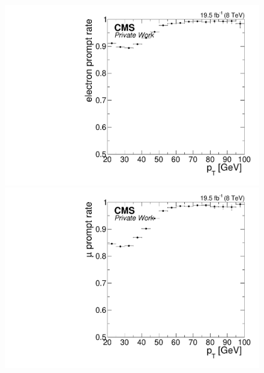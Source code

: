 \begin{figure}[tbp]
\centering
\begin{minipage}[t]{0.49\textwidth}
  \includegraphics[width=\textwidth]{plots/BG/nonPrompt/promptRate_ele_Inclusive_Full2012_TrailingPt_range100.pdf}
\end{minipage}
\begin{minipage}[t]{0.49\textwidth}
\includegraphics[width=\textwidth]{plots/BG/nonPrompt/promptRate_mu_Inclusive_Full2012_TrailingPt_range100.pdf}
\end{minipage}
\begin{minipage}[t]{0.49\textwidth}

\end{minipage}
\end{figure}
